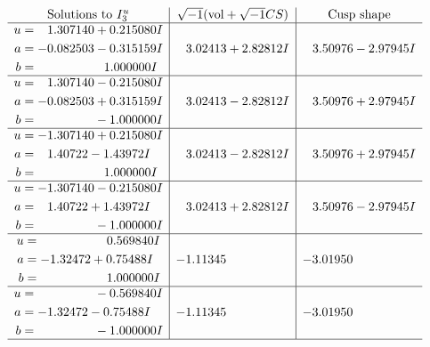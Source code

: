 \documentclass[1p]{elsarticle_modified}
\theoremstyle{definition}
\newcommand{\I}{\sqrt{-1}}
\begin{document}
$$\begin{array}{c|c|c}  
\text{Solutions to }I^u_{3}& \I (\text{vol} + \sqrt{-1}CS) & \text{Cusp shape}\\
 \hline 
\begin{aligned}
u &= \phantom{-}1.307140 + 0.215080 I \\
a &= -0.082503 - 0.315159 I \\
b &= \phantom{-0.000000 -}1.000000 I\end{aligned}
 & \phantom{-}3.02413 + 2.82812 I & \phantom{-}3.50976 - 2.97945 I \\ \hline\begin{aligned}
u &= \phantom{-}1.307140 - 0.215080 I \\
a &= -0.082503 + 0.315159 I \\
b &= \phantom{-0.000000 } -1.000000 I\end{aligned}
 & \phantom{-}3.02413 - 2.82812 I & \phantom{-}3.50976 + 2.97945 I \\ \hline\begin{aligned}
u &= -1.307140 + 0.215080 I \\
a &= \phantom{-}1.40722 - 1.43972 I \\
b &= \phantom{-0.000000 -}1.000000 I\end{aligned}
 & \phantom{-}3.02413 - 2.82812 I & \phantom{-}3.50976 + 2.97945 I \\ \hline\begin{aligned}
u &= -1.307140 - 0.215080 I \\
a &= \phantom{-}1.40722 + 1.43972 I \\
b &= \phantom{-0.000000 } -1.000000 I\end{aligned}
 & \phantom{-}3.02413 + 2.82812 I & \phantom{-}3.50976 - 2.97945 I \\ \hline\begin{aligned}
u &= \phantom{-0.000000 -}0.569840 I \\
a &= -1.32472 + 0.75488 I \\
b &= \phantom{-0.000000 -}1.000000 I\end{aligned}
 & -1.11345\phantom{ +0.000000I} & -3.01950\phantom{ +0.000000I} \\ \hline\begin{aligned}
u &= \phantom{-0.000000 } -0.569840 I \\
a &= -1.32472 - 0.75488 I \\
b &= \phantom{-0.000000 } -1.000000 I\end{aligned}
 & -1.11345\phantom{ +0.000000I} & -3.01950\phantom{ +0.000000I}\\
 \hline 
 \end{array}$$\newpage
\end{document}
